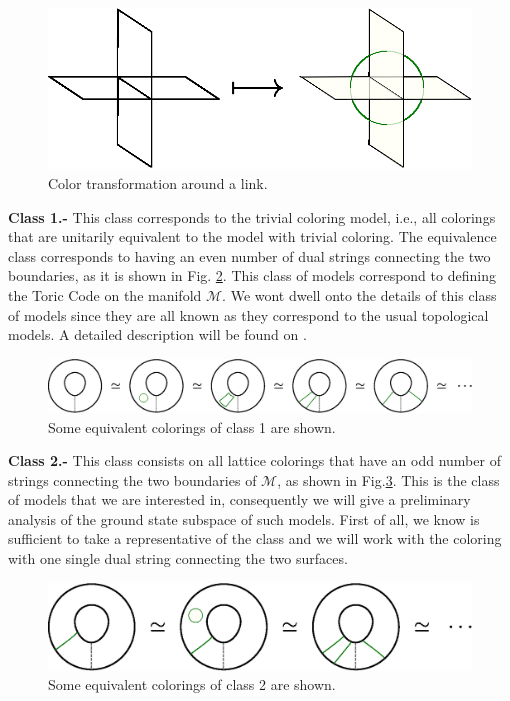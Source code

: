 \documentclass[a4paper,11pt]{article}
\theoremstyle{plain}%
\theoremstyle{definition}
\theoremstyle{remark}
\begin{document}
\begin{figure}[h!]
\centering
\includegraphics[scale=0.6]{coltrans.eps}
\caption{\label{fig:coltrans2}Color transformation around a link.}
\end{figure}

\textbf{Class 1.-} This class corresponds to the trivial coloring model, i.e., all colorings that are unitarily equivalent to the model with trivial coloring. The equivalence class corresponds to having an even number of dual strings connecting the two boundaries, as it is shown in Fig. \ref{fig:class1}. This class of models correspond to defining the Toric Code on the manifold \(\mathcal{M}\). We wont dwell onto the details of this class of models since they are all known as they correspond to the usual topological models. A detailed description will be found on \cite{pablo}.
\begin{figure}[h!]
\centering
\includegraphics[scale=0.55]{class1.eps}
\caption{\label{fig:class1}Some equivalent colorings of class 1 are shown.}
\end{figure}

\textbf{Class 2.-} This class consists on all lattice colorings that have an odd number of strings connecting the two boundaries of \(\mathcal{M}\), as shown in Fig.\ref{fig:class2}. This is the class of models that we are interested in, consequently we will give a preliminary analysis of the ground state subspace of such models. First of all, we know is sufficient to take a representative of the class and we will work with the coloring with one single dual string connecting the two surfaces.
\begin{figure}[h!]
\centering
\includegraphics[scale=0.55]{class2.eps}
\caption{\label{fig:class2}Some equivalent colorings of class 2 are shown.}
\end{figure}
\end{document}
